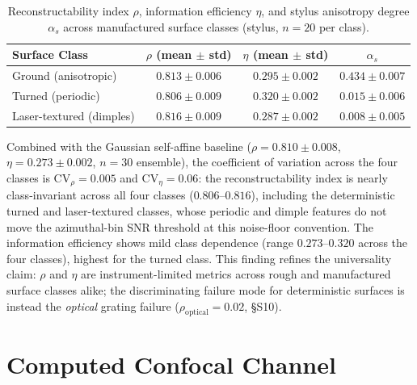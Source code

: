 \documentclass[review,12pt]{elsarticle}
\begin{document}
\begin{table}[htbp]
    \centering
    \caption{Reconstructability index $\rho$, information efficiency $\eta$, and stylus anisotropy degree $\alpha_s$ across manufactured surface classes (stylus, $n=20$ per class).}
    \label{tab:ng_ensemble}
    \begin{tabular}{lccc}
        \toprule
        Surface Class & $\rho$ (mean $\pm$ std) & $\eta$ (mean $\pm$ std) & $\alpha_s$ \\
        \midrule
        Ground (anisotropic) & $0.813 \pm 0.006$ & $0.295 \pm 0.002$ & $0.434 \pm 0.007$ \\
        Turned (periodic) & $0.806 \pm 0.009$ & $0.320 \pm 0.002$ & $0.015 \pm 0.006$ \\
        Laser-textured (dimples) & $0.816 \pm 0.009$ & $0.287 \pm 0.002$ & $0.008 \pm 0.005$ \\
        \bottomrule
    \end{tabular}
\end{table}

Combined with the Gaussian self-affine baseline ($\rho = 0.810 \pm 0.008$, $\eta = 0.273 \pm 0.002$, $n=30$ ensemble), the coefficient of variation across the four classes is $\text{CV}_\rho = 0.005$ and $\text{CV}_\eta = 0.06$: the reconstructability index is nearly class-invariant across all four classes ($0.806$--$0.816$), including the deterministic turned and laser-textured classes, whose periodic and dimple features do not move the azimuthal-bin SNR threshold at this noise-floor convention. The information efficiency shows mild class dependence (range $0.273$--$0.320$ across the four classes), highest for the turned class. This finding refines the universality claim: $\rho$ and $\eta$ are instrument-limited metrics across rough and manufactured surface classes alike; the discriminating failure mode for deterministic surfaces is instead the \emph{optical} grating failure ($\rho_\mathrm{optical} = 0.02$, \S S10).

\section{Computed Confocal Channel}
\label{S6}
\end{document}
